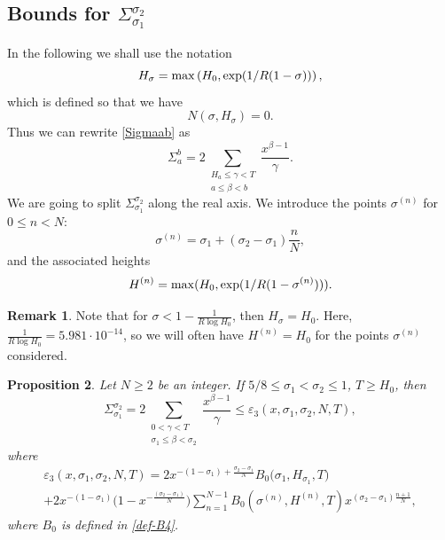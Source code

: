 \documentclass[10pt]{amsart}
\newcommand{\s}{\sigma}
\newtheorem{prop}{Proposition}[section]
\theoremstyle{definition}
\newtheorem{Rem}[prop]{Remark}
\numberwithin{equation}{section}
\begin{document}
\subsection{Bounds for $\Sigma_{\sigma_1}^{\sigma_2}$}

In the following we shall use the notation
\begin{equation}\label{def-H0s}
H_{\sigma} = {\rm max}\left(H_0, \exp(1/R(1-\s))\right),
\end{equation}
which is defined so that we have
\[ N(\s,H_{\sigma}) = 0. \]
Thus we can rewrite \eqref{Sigmaab} as
\begin{equation}\label{Sigmaab1}
\Sigma_{a}^{b}= 2\sum_{\substack{H_a \le \gamma<T \\ a \le \beta <  b}} \frac{x^{\beta-1}}{\gamma}.
\end{equation}
We are going to split $\Sigma_{\sigma_1}^{\sigma_2}$ along the real axis.
We introduce the points $\s^{(n)}$ for $0 \le  n < N$:
\begin{equation}\label{def-sigma(n)}
\s^{(n)}  = \s_1+ (\s_2 - \s_1)\frac{n}{N},
\end{equation}
and the associated heights
\begin{equation}\label{def-H(n)}
H^{(n)} = {\rm max}(H_0, \exp(1/R(1-\s^{(n)}))) .
\end{equation}
%
\begin{Rem}
Note that for $\s<1-\frac1{R\log H_0}$, then $H_{\sigma} =  H_0$.
Here, $\frac1{R\log H_0} = 5.981 \cdot 10^{-14}$, %
so we will often have $H^{(n)} =H_0$ for the points $\s^{(n)}$ considered.
\end{Rem}
%
\begin{prop}\label{bnd-Sigma-sigma1-sigma2}
Let $N\ge2$ be an integer. 
If $ 5/8 \le  \s_1 < \s_2 \le  1$, $T \geq H_0$, then
\begin{equation}   
\Sigma_{\sigma_1}^{\sigma_2}  =2\sum_{\substack{0<\gamma<T \\ \sigma_1 \le \beta <  \sigma_2}} \frac{x^{\beta-1}}{\gamma} \le  \varepsilon_3(x,\s_1,\s_2,N,T) ,
\end{equation}
where
\begin{multline}\label{def-epsilon3}
\varepsilon_3(x,\s_1,\s_2,N,T)  = 2 x^{-(1-\s_1)+\frac{\s_2-\s_1}{N}}  B_0\big( \s_1, H_{\s_1}, T\big) 
\\+ 2x^{-(1-\s_1)} \big(1 - x^{-\frac{(\s_2-\s_1)}{N}}\big)  \sum_{n=1}^{N-1}B_0( \s^{(n)}, H^{(n)}, T) x^{ (\s_2-\s_1)\frac{n+1}{N}} ,
\end{multline}
where $B_0$ is defined in \eqref{def-B4}.
\end{prop}
\end{document}
